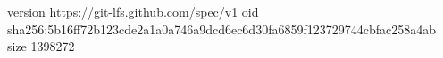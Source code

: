 version https://git-lfs.github.com/spec/v1
oid sha256:5b16ff72b123cde2a1a0a746a9dcd6ec6d30fa6859f123729744cbfac258a4ab
size 1398272
